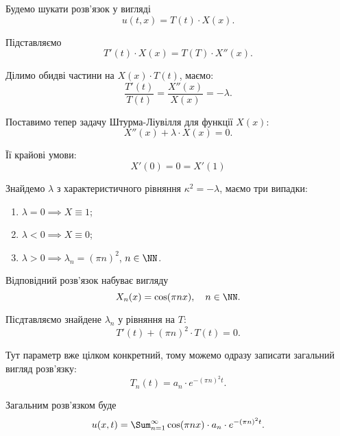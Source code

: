 \begin{solution}
	Будемо шукати розв'язок у вигляді
	\begin{equation*}
		u(t, x) = T(t) \cdot X(x).
	\end{equation*}

	Підставляємо
	\begin{equation*}
		T'(t) \cdot X(x) = T(T) \cdot X''(x).
	\end{equation*}
	
	Ділимо обидві частини на $X(x) \cdot T(t)$, маємо:
	\begin{equation*}
		\frac{T'(t)}{T(t)} = \frac{X''(x)}{X(x)} = - \lambda.
	\end{equation*}
	
	Поставимо тепер задачу Штурма-Ліувілля для функції $X(x)$:
	\begin{equation*}
		X''(x) + \lambda \cdot X(x) = 0.
	\end{equation*}

	Її крайові умови:
	\begin{equation*}
		X'(0) = 0 = X'(1)
	\end{equation*}

	Знайдемо $\lambda$ з характеристичного рівняння $\kappa^2 = - \lambda$, маємо три випадки:
	\begin{enumerate}
		\item $\lambda = 0 \implies X \equiv 1$;
		\item $\lambda < 0 \implies X \equiv 0$;
		\item $\lambda > 0 \implies \lambda_n = (\pi n)^2$, $n \in \NN$.
	\end{enumerate}

	Відповідний розв'язок набуває вигляду
	\begin{equation*}
		X_n(x) = \cos(\pi n x), \quad n \in \NN.
	\end{equation*}

	Пісдтавляємо знайдене $\lambda_n$ у рівняння на $T$:
	\begin{equation*}
		T'(t) + (\pi n)^2 \cdot T(t) = 0.
	\end{equation*}

	Тут параметр вже цілком конкретний, тому можемо одразу записати загальний вигляд розв'язку:
	\begin{equation*}
		T_n(t) = a_n \cdot e^{ - (\pi n)^2 t}.
	\end{equation*}

	Загальним розв'язком буде
	\begin{equation*}
		u(x, t) = \Sum_{n = 1}^\infty \cos(\pi n x) \cdot a_n \cdot e^{ - (\pi n)^2 t}.
	\end{equation*}


\end{solution}
